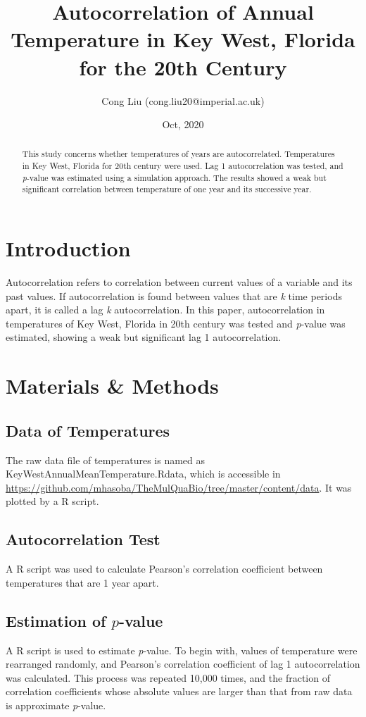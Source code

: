 \documentclass[12pt]{article}
\title{Autocorrelation of Annual Temperature in Key West, Florida for the 20th Century}
\author{Cong Liu (cong.liu20@imperial.ac.uk)}
\date{Oct, 2020}
\begin{document}
  \maketitle
  \tableofcontents
  \begin{abstract}
    This study concerns whether temperatures of years are autocorrelated. Temperatures
    in Key West, Florida for 20th century were used. Lag 1 autocorrelation was tested, and 
    \textit{p}-value was estimated using a simulation approach. The results showed a weak but significant
    correlation between temperature of one year and its successive year. 
    
  \end{abstract}
  
  \section{Introduction}
  Autocorrelation refers to correlation between current values of a variable and its past values.
  If autocorrelation is found between values that are \textit{k} time periods apart, it is called
  a lag \textit{k} autocorrelation. In this paper, autocorrelation in temperatures of Key West, 
  Florida in 20th century was tested and \textit{p}-value was estimated, showing a weak but significant
  lag 1 autocorrelation.
  
  \section{Materials \& Methods}
   
    \subsection{Data of Temperatures}
    The raw data file of temperatures is named as KeyWestAnnualMeanTemperature.Rdata, 
    which is accessible in 
    \newline
    \href{https://github.com/mhasoba/TheMulQuaBio/tree/master/content/data}{https://github.com/mhasoba/TheMulQuaBio/tree/master/content/data}.
    It was plotted by a R script.
    
    \subsection{Autocorrelation Test}
    A R script was used to calculate Pearson's correlation coefficient between temperatures that
    are 1 year apart.
    
    \subsection{Estimation of \texorpdfstring{$\mathit{p}$}{}-value}
    A R script is used to estimate \textit{p}-value. To begin with, values of temperature were
    rearranged randomly, and Pearson's correlation coefficient of lag 1 autocorrelation was calculated.
    This process was repeated 10,000 times, and the fraction of correlation coefficients whose absolute 
    values are larger than that from raw data is approximate \textit{p}-value.
  
\end{document}
